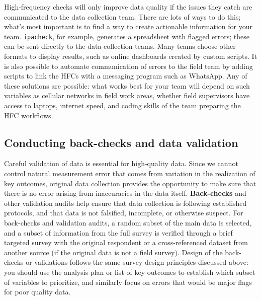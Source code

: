 High-frequency checks will only improve data quality
if the issues they catch are communicated to the data collection team.
There are lots of ways to do this;
what's most important is to find a way to create actionable information for your team.
\texttt{ipacheck}, for example, generates a spreadsheet with flagged errors;
these can be sent directly to the data collection teams.
Many teams choose other formats to display results,
such as online dashboards created by custom scripts.
It is also possible to automate communication of errors to the field team
by adding scripts to link the HFCs with a messaging program such as WhatsApp.
Any of these solutions are possible:
what works best for your team will depend on such variables as
cellular networks in field work areas, whether field supervisors have access to laptops,
internet speed, and coding skills of the team preparing the HFC workflows.

\subsection{Conducting back-checks and data validation}

Careful validation of data is essential for high-quality data.
Since we cannot control natural measurement error
that comes from variation in the realization of key outcomes,
original data collection provides the opportunity to make sure
that there is no error arising from inaccuracies in the data itself.
\textbf{Back-checks} and
other validation audits help ensure that data collection is following established protocols,
and that data is not falsified, incomplete, or otherwise suspect.
For back-checks and validation audits, a random subset of the main data is selected,
and a subset of information from the full survey is
verified through a brief targeted survey with the original respondent
or a cross-referenced dataset from another source (if the original data is not a field survey).
Design of the back-checks or validations follows the same survey design
principles discussed above: you should use the analysis plan
or list of key outcomes to establish which subset of variables to prioritize,
and similarly focus on errors that would be major flags for poor quality data.

